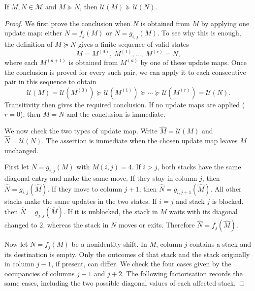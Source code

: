 \documentclass[reqno]{amsart}
\begin{document}
\begin{lemma}\label{lem:partial_ordering}
If $M,N\in\mathcal M$ and $M\succeq N$, then
$\mathcal U(M)\succeq\mathcal U(N)$.
\end{lemma}
\begin{proof}
We first prove the conclusion when $N$ is obtained from $M$ by applying
one update map: either $N=f_j(M)$ or $N=g_{i,j}(M)$.
To see why this is enough, the definition of $M\succeq N$ gives a finite
sequence of valid states
\[
 M=M^{(0)},\ M^{(1)},\ldots,\ M^{(r)}=N,
\]
where each $M^{(a+1)}$ is obtained from $M^{(a)}$ by one of these update maps.
Once the conclusion is proved for every such pair, we can apply it to
each consecutive pair in this sequence to obtain
\[
 \mathcal U(M)=\mathcal U(M^{(0)})
 \succeq\mathcal U(M^{(1)})\succeq\cdots
 \succeq\mathcal U(M^{(r)})=\mathcal U(N).
\]
Transitivity then gives the required conclusion. If no update maps are applied
($r=0$), then $M=N$ and the conclusion is immediate.

We now check the two types of update map. Write
$\widehat M=\mathcal U(M)$ and $\widehat N=\mathcal U(N)$.
The assertion is immediate when the chosen update map leaves $M$ unchanged.

First let $N=g_{i,j}(M)$ with $M(i,j)=4$. If $i>j$, both stacks have
the same diagonal entry and make the same move. If they stay in column
$j$, then $\widehat N=g_{i,j}(\widehat M)$. If they move to column
$j+1$, then $\widehat N=g_{i,j+1}(\widehat M)$. All other stacks make
the same updates in the two states. If $i=j$ and stack $j$ is blocked,
then $\widehat N=g_{j,j}(\widehat M)$. If it is unblocked, the stack in
$M$ waits with its diagonal changed to $2$, whereas the stack in $N$
moves or exits. Therefore $\widehat N=f_j(\widehat M)$.

Now let $N=f_j(M)$ be a nonidentity shift. In $M$, column $j$ contains
a stack and its destination is empty. Only the outcomes of that stack
and the stack originally in column $j-1$, if present, can differ. We
check the four cases given by the occupancies of columns $j-1$ and
$j+2$. The following factorisation records the same cases, including
the two possible diagonal values of each affected stack.


\end{proof}
\end{document}

